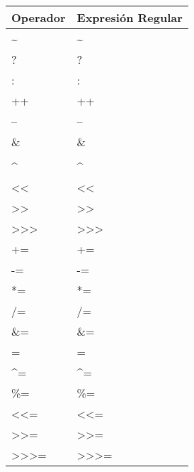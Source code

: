 \documentclass [a4paper,titlepage]{report}
\begin{document}
\begin{longtable}{l | l}
Operador                                    & Expresión Regular                             \tabularnewline \endhead
\textasciitilde{}                           & \textasciitilde{}                             \tabularnewline
?                                           & ?                                             \tabularnewline
:                                           & :                                             \tabularnewline
++                                          & ++                                            \tabularnewline
--                                          & --                                            \tabularnewline
\&{}                                        & \&{}                                          \tabularnewline
\textbar{}                                  & \textbar{}                                    \tabularnewline
\^{}                                        & \^{}                                          \tabularnewline
\textless{}\textless{}                      & \textless{}\textless{}                        \tabularnewline
\textgreater{}\textgreater{}                & \textgreater{}\textgreater{}                  \tabularnewline
\textgreater{}\textgreater{}\textgreater{}  & \textgreater{}\textgreater{}\textgreater{}    \tabularnewline
+=                                          & +=                                            \tabularnewline
-=                                          & -=                                            \tabularnewline
*=                                          & *=                                            \tabularnewline
/=                                          & /=                                            \tabularnewline
\&{}=                                       & \&{}=                                         \tabularnewline
\textbar{}=                                 & \textbar{}=                                   \tabularnewline
\^{}=                                       & \^{}=                                         \tabularnewline
\%{}=                                       & \%{}=                                         \tabularnewline
\textless{}\textless{}=                     & \textless{}\textless{}=                       \tabularnewline
\textgreater{}\textgreater{}=               & \textgreater{}\textgreater{}=                 \tabularnewline
\textgreater{}\textgreater{}\textgreater{}= & \textgreater{}\textgreater{}\textgreater{}=   \tabularnewline
\end{longtable}\tabularnewline
\end{document}
